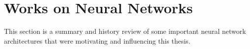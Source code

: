 
\section{Works on Neural Networks}
This section is a summary and history review of some important neural network architectures that were motivating and influencing this thesis.
